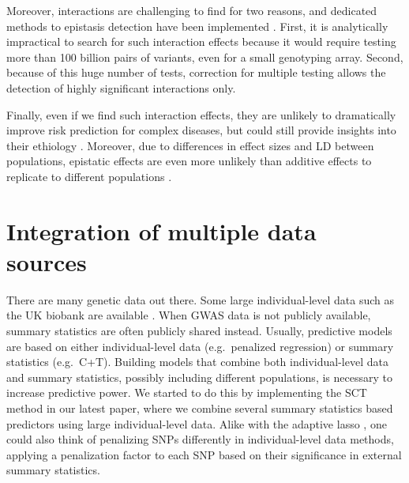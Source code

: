 Moreover, interactions are challenging to find for two reasons, and dedicated methods to epistasis detection have been implemented \cite[]{niel2015survey}. First, it is analytically impractical to search for such interaction effects because it would require testing more than 100 billion pairs of variants, even for a small genotyping array. Second, because of this huge number of tests, correction for multiple testing allows the detection of highly significant interactions only.

Finally, even if we find such interaction effects, they are unlikely to dramatically improve risk prediction for complex diseases, but could still provide insights into their ethiology \cite[]{aschard2012inclusion}. 
Moreover, due to differences in effect sizes and LD between populations, epistatic effects are even more unlikely than additive effects to replicate to different populations  \cite[]{hill2008data,visscher201710}.

\section{Integration of multiple data sources}

There are many genetic data out there. Some large individual-level data such as the UK biobank are available \cite[]{bycroft2017genome}. When GWAS data is not publicly available, summary statistics are often publicly shared instead. 
Usually, predictive models are based on either individual-level data (e.g.\ penalized regression) or summary statistics (e.g.\ C+T).
Building models that combine both individual-level data and summary statistics, possibly including different populations, is necessary to increase predictive power.
We started to do this by implementing the SCT method in our latest paper, where we combine several summary statistics based predictors using large individual-level data.
Alike with the adaptive lasso \cite[]{zou2006adaptive}, one could also think of penalizing SNPs differently in individual-level data methods, applying a penalization factor to each SNP based on their significance in external summary statistics.

